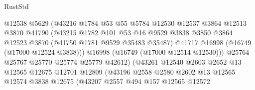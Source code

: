 \begin{lexlean}{RustStd}
\begin{coremodule}
                                  @12538
                                  @5629
                                  (@43216
                                    @1784
                                    @53
                                    @55
                                    @5784
                                    @12530
                                    @12537
                                    @3864
                                    @12513
                                    @3870
                                    @41790
                                    (@43215
                                      @1782
                                      @101
                                      @53
                                      @16
                                      @9529
                                      @3838
                                      @3850
                                      @3864
                                      @12523
                                      @3870
                                      (@41750 @1781 @9529 @35483 @35487)
                                      @41717
                                      @16998
                                      (@16749 (@17000 @12524 @3838)))
                                    @16998
                                    (@16749 (@17000 @12514 @12530)))
                                  @25764
                                  @25767
                                  @25770
                                  @25774
                                  @25779
                                  @42612)
                                (@43261
                                  @12540
                                  @2603
                                  @2652
                                  @13
                                  @12565
                                  @12675
                                  @12701
                                  @12809
                                  (@43196
                                    @2558
                                    @2580
                                    @2602
                                    @13
                                    @12565
                                    @12574
                                    @3838
                                    @12675
                                    (@43207
                                      @2557
                                      @494
                                      @157
                                      @12565
                                      @12572

\end{coremodule}
\end{lexlean}
